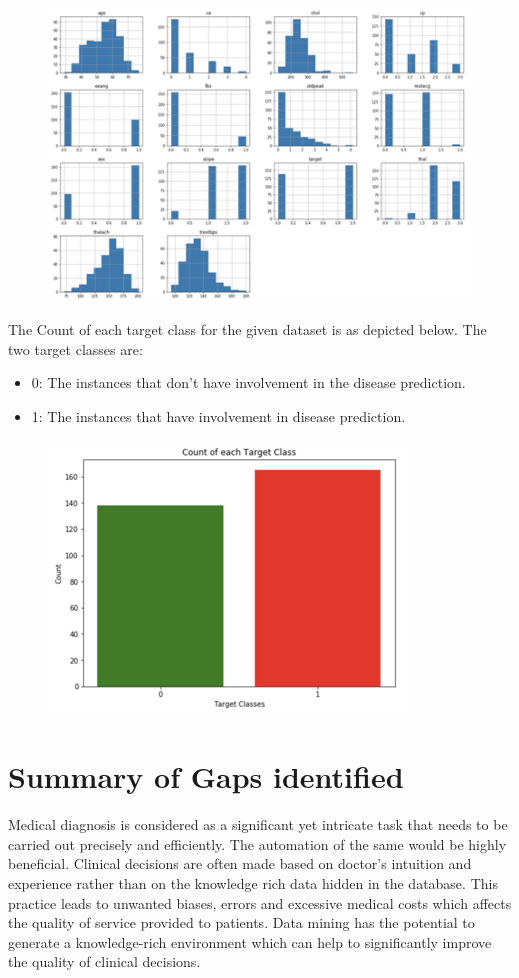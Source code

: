 \documentclass{book}
\begin{document}
    \begin{figure}
	    	\includegraphics[]{images/histogram.png}
    \end{figure}
    
    
    \pagebreak
    The Count of each target class for the given dataset is as depicted below. The two target classes are:
    \begin{itemize}
    	\item 0: The instances that don’t have involvement in the disease prediction.
    	\item 1: The instances that have involvement in disease prediction.
    \end{itemize}

	\begin{figure}
			\includegraphics[]{images/count.png}
	\end{figure}

    
    
    
    \section{Summary of Gaps identified}
    Medical diagnosis is considered as a significant yet intricate task that needs to be carried out precisely and efficiently. The automation of the same would be highly beneficial. Clinical decisions are often made based on doctor’s intuition and experience rather than on the knowledge rich data hidden in the database. This practice leads to unwanted biases, errors and excessive medical costs which affects the quality of service provided to patients. Data mining has the potential to generate a knowledge-rich environment which can help to significantly improve the quality of clinical decisions.
    
\end{document}
